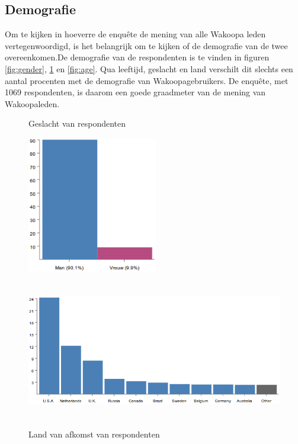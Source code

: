 \documentclass[a4paper, 10pt, pdftex]{report}
\begin{document}
      \subsection{Demografie}
        Om te kijken in hoeverre de enqu\^ete de mening van alle Wakoopa leden vertegenwoordigd, is het belangrijk om te kijken of de demografie van de twee overeenkomen.De demografie van de respondenten is te vinden in figuren \ref{fig:gender}, \ref{fig:country} en \ref{fig:age}. Qua leeftijd, geslacht en land verschilt dit slechts een aantal procenten met de demografie van Wakoopagebruikers. De enqu\^ete, met 1069 respondenten, is daarom een goede graadmeter van de mening van Wakoopaleden.
        \begin{figure}
          \begin{center}
          \caption{Geslacht van respondenten}
            \includegraphics[height=60mm, angle=90]{../images/enquete/gender}
          \label{fig:gender}

          \caption{Land van afkomst van respondenten}
            \includegraphics[height=60mm, angle=90]{../images/enquete/country}
            \label{fig:country}

          \end{center}
        \end{figure}
\end{document}
